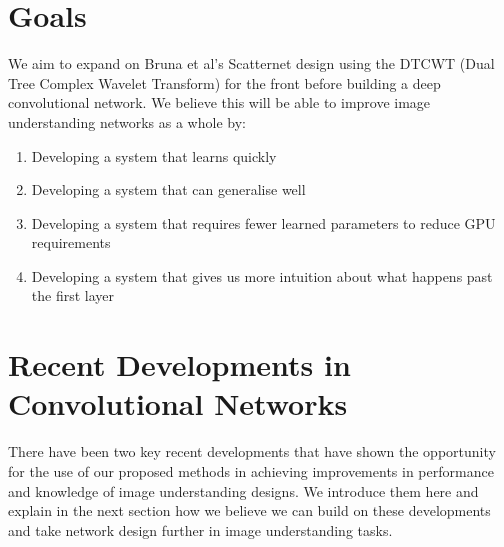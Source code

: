\documentclass[12pt, a4paper, oneside, english]{article}
\begin{document}
\section{Goals}
We aim to expand on Bruna et al's Scatternet design using the DTCWT (Dual Tree Complex Wavelet Transform) for the front before building a deep convolutional network. We believe this will be able to improve image understanding networks as a whole by:
\begin{enumerate}
\item Developing a system that learns quickly
\item Developing a system that can generalise well
\item Developing a system that requires fewer learned parameters to reduce GPU requirements
\item Developing a system that gives us more intuition about what happens past the first layer
\end{enumerate}

\section{Recent Developments in Convolutional Networks}
There have been two key recent developments that have shown the opportunity for the use of our proposed methods in achieving improvements in performance and knowledge of image understanding designs. We introduce them here and explain in the next section how we believe we can build on these developments and take network design further in image understanding tasks.
\end{document}
